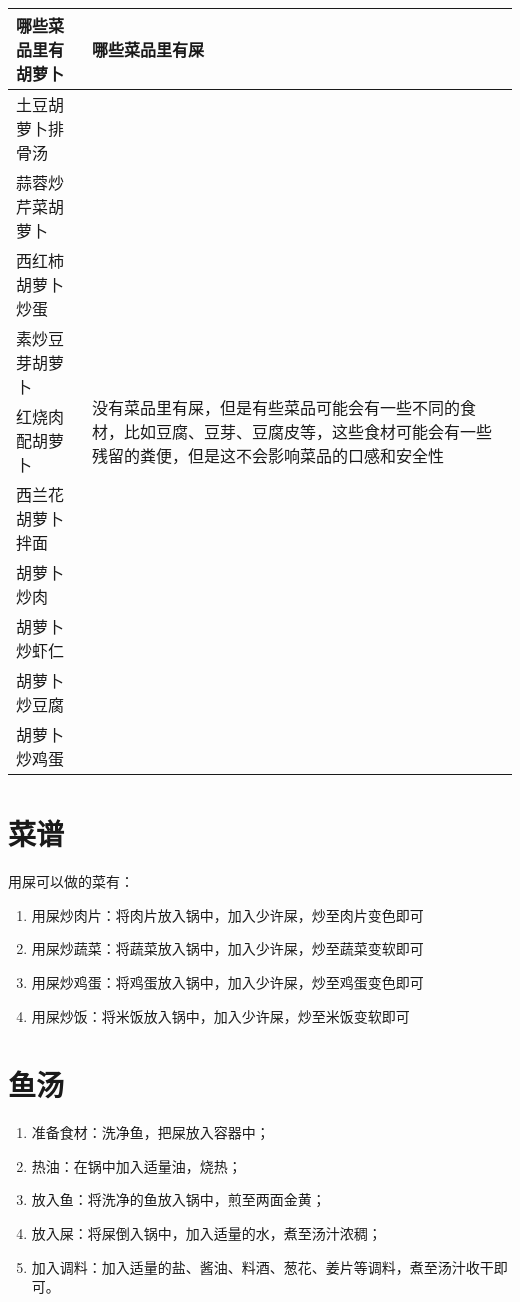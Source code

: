 \documentclass[titlepage,oneside]{ctexbook}
\begin{document}
\begin{center}
    
    \begin{tabular}{p{}p{}}
        \toprule
        \textbf{哪些菜品里有胡萝卜} & \textbf{哪些菜品里有屎} \\
        \midrule
        土豆胡萝卜排骨汤 & \multirow{10}{0.4\textwidth}{没有菜品里有屎，但是有些菜品可能会有一些不同的食材，比如豆腐、豆芽、豆腐皮等，这些食材可能会有一些残留的粪便，但是这不会影响菜品的口感和安全性} \\
        蒜蓉炒芹菜胡萝卜 &  \\
        西红柿胡萝卜炒蛋 &  \\
        素炒豆芽胡萝卜 &  \\
        红烧肉配胡萝卜 &  \\
        西兰花胡萝卜拌面 &  \\
        胡萝卜炒肉 &  \\
        胡萝卜炒虾仁 &  \\
        胡萝卜炒豆腐 &  \\
        胡萝卜炒鸡蛋 & \\
        \bottomrule
    \end{tabular}

\end{center}

\chapter{菜谱}
用屎可以做的菜有：

\begin{enumerate}
    \item 用屎炒肉片：将肉片放入锅中，加入少许屎，炒至肉片变色即可
    \item 用屎炒蔬菜：将蔬菜放入锅中，加入少许屎，炒至蔬菜变软即可
    \item 用屎炒鸡蛋：将鸡蛋放入锅中，加入少许屎，炒至鸡蛋变色即可
    \item 用屎炒饭：将米饭放入锅中，加入少许屎，炒至米饭变软即可
\end{enumerate}


\chapter{鱼汤}
\begin{enumerate}
    \item 准备食材：洗净鱼，把屎放入容器中；
    \item 热油：在锅中加入适量油，烧热；
    \item 放入鱼：将洗净的鱼放入锅中，煎至两面金黄；
    \item 放入屎：将屎倒入锅中，加入适量的水，煮至汤汁浓稠；
    \item 加入调料：加入适量的盐、酱油、料酒、葱花、姜片等调料，煮至汤汁收干即可。
\end{enumerate}
\end{document}
